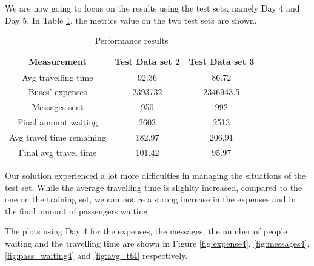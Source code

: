 We are now going to focus on the results using the test sets, namely Day 4 and Day 5. In Table \ref{table:table2}, the metrics value on the two test sets are shown.

\begin{table}[htbp]
\centering
\begin{tabular}{ |c|c|c|  }
 \hline
  Measurement & Test Data set 2 & Test Data set 3 \\
 \hline
  Avg travelling time & 92.36 & 86.72 \\
  Buses' expenses & 2393732 & 2346943.5 \\
  Messages sent & 950 & 992 \\
  Final amount waiting & 2603 & 2513 \\
  Avg travel time remaining & 182.97 & 206.91 \\
  Final avg travel time & 101.42 & 95.97 \\
 \hline
\end{tabular}
\label{table:table2}
\caption{Performance results}
\end{table}

Our solution experienced a lot more difficulties in managing the situations of the test set. While the average travelling time is slighlty increased, compared to the one on the training set, we can notice a strong increase in the expenses and in the final amount of passengers waiting. 

The plots using Day 4 for the expenses, the messages, the number of people waiting and the travelling time are shown in Figure \ref{fig:expense4}, \ref{fig:messages4}, \ref{fig:pass_waiting4} and \ref{fig:avg_tt4} respectively.

